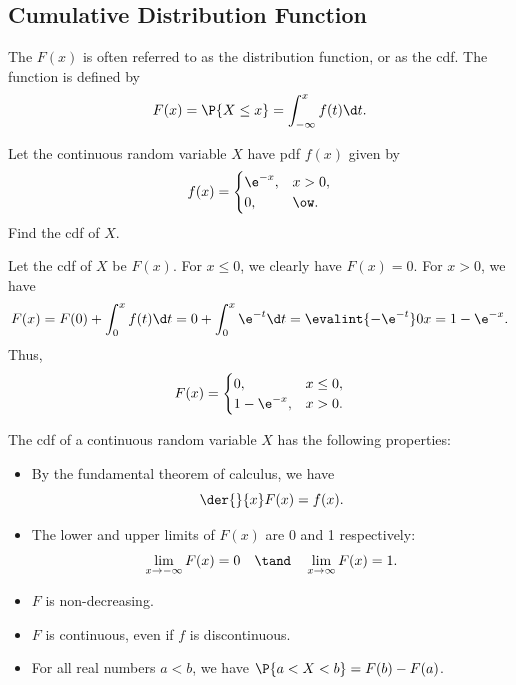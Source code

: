 \subsection{Cumulative Distribution Function}

\begin{definition}
    The  $F(x)$ is often referred to as the distribution function, or as the cdf. The function is defined by \[F(x) = \P{X \leq x} = \int_{-\infty}^x f(t) \d t.\]
\end{definition}

\begin{sample}
    Let the continuous random variable $X$ have pdf $f(x)$ given by \[f(x) = \begin{cases}
        \e^{-x}, & x > 0,\\
        0, & \ow.
    \end{cases}\] Find the cdf of $X$.
\end{sample}
\begin{sampans}
    Let the cdf of $X$ be $F(x)$. For $x \leq 0$, we clearly have $F(x) = 0$. For $x > 0$, we have \[F(x) = F(0) + \int_0^x f(t) \d t = 0 + \int_0^x \e^{-t} \d t = \evalint{-\e^{-t}}0x = 1 - \e^{-x}.\] Thus, \[F(x) = \begin{cases}
        0, & x \leq 0,\\
        1 - \e^{-x}, & x > 0.
    \end{cases}\]
\end{sampans}

The cdf of a continuous random variable $X$ has the following properties:

\begin{fact}
    \phantom{.}
    \begin{itemize}
        \item By the fundamental theorem of calculus, we have \[\der{}{x} F(x) = f(x).\]
        \item The lower and upper limits of $F(x)$ are 0 and 1 respectively: \[\lim_{x \to -\infty} F(x) = 0 \quad \tand \quad \lim_{x \to \infty} F(x) = 1.\]
        \item $F$ is non-decreasing.
        \item $F$ is continuous, even if $f$ is discontinuous.
        \item For all real numbers $a < b$, we have $\P{a < X < b} = F(b) - F(a)$.
    \end{itemize}
\end{fact}

